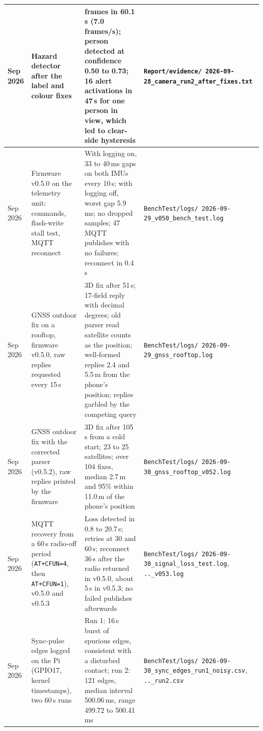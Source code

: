 \begin{longtable}{|>{\raggedright\arraybackslash}p{1.7cm}|>{\raggedright\arraybackslash}p{3.6cm}|>{\raggedright\arraybackslash}p{5.2cm}|>{\raggedright\arraybackslash}p{3.6cm}|}
28 Sep 2026 & Hazard detector after the label and colour fixes & 419 frames in 60.1\,s (7.0\,frames/s); person detected at confidence 0.50 to 0.73; 16 alert activations in 47\,s for one person in view, which led to clear-side hysteresis & \texttt{Report/\allowbreak{}evidence/\allowbreak{} 2026-09-28\_\allowbreak{}camera\_\allowbreak{}run2\_\allowbreak{}after\_\allowbreak{}fixes.txt} \\ \hline
29 Sep 2026 & Firmware v0.5.0 on the telemetry unit: commands, flash-write stall test, MQTT reconnect & With logging on, 33 to 40\,ms gaps on both IMUs every 10\,s; with logging off, worst gap 5.9\,ms; no dropped samples; 47 MQTT publishes with no failures; reconnect in 0.4\,s & \texttt{BenchTest/\allowbreak{}logs/\allowbreak{} 2026-09-29\_\allowbreak{}v050\_\allowbreak{}bench\_\allowbreak{}test.log} \\ \hline
29 Sep 2026 & GNSS outdoor fix on a rooftop, firmware v0.5.0, raw replies requested every 15\,s & 3D fix after 51\,s; 17-field reply with decimal degrees; old parser read satellite counts as the position; well-formed replies 2.4 and 5.5\,m from the phone's position; replies garbled by the competing query & \texttt{BenchTest/\allowbreak{}logs/\allowbreak{} 2026-09-29\_\allowbreak{}gnss\_\allowbreak{}rooftop.log} \\ \hline
30 Sep 2026 & GNSS outdoor fix with the corrected parser (v0.5.2), raw replies printed by the firmware & 3D fix after 105\,s from a cold start; 23 to 25 satellites; over 104 fixes, median 2.7\,m and 95\% within 11.0\,m of the phone's position & \texttt{BenchTest/\allowbreak{}logs/\allowbreak{} 2026-09-30\_\allowbreak{}gnss\_\allowbreak{}rooftop\_\allowbreak{}v052.log} \\ \hline
30 Sep 2026 & MQTT recovery from a 60\,s radio-off period (\texttt{AT+CFUN=4}, then \texttt{AT+CFUN=1}), v0.5.0 and v0.5.3 & Loss detected in 0.8 to 20.7\,s; retries at 30 and 60\,s; reconnect 36\,s after the radio returned in v0.5.0, about 5\,s in v0.5.3; no failed publishes afterwards & \texttt{BenchTest/\allowbreak{}logs/\allowbreak{} 2026-09-30\_\allowbreak{}signal\_\allowbreak{}loss\_\allowbreak{}test.log}, \texttt{..\_v053.log} \\ \hline
30 Sep 2026 & Sync-pulse edges logged on the Pi (GPIO17, kernel timestamps), two 60\,s runs & Run 1: 16\,s burst of spurious edges, consistent with a disturbed contact; run 2: 121 edges, median interval 500.06\,ms, range 499.72 to 500.41\,ms & \texttt{BenchTest/\allowbreak{}logs/\allowbreak{} 2026-09-30\_\allowbreak{}sync\_\allowbreak{}edges\_\allowbreak{}run1\_\allowbreak{}noisy.csv}, \texttt{..\_run2.csv} \\ \hline

\end{longtable}
